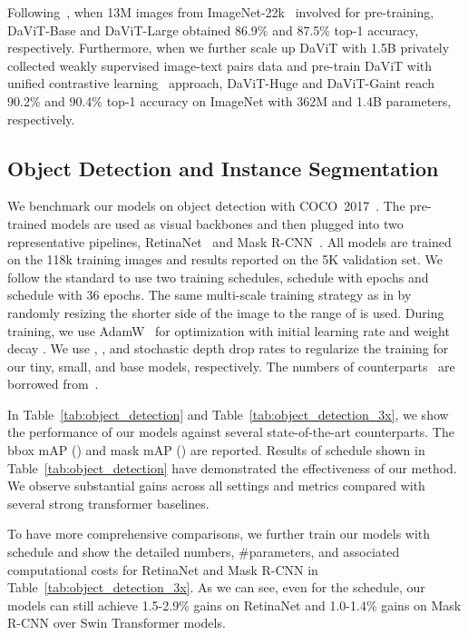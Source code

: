 \documentclass[runningheads]{llncs}
\newcommand{\model}{DaViT\xspace}
\newcommand{\modelInTable}{DaViT\xspace}
\begin{document}
Following~\cite{wu2021cvt,dosovitskiy2020image,liu2021swin}, when 13M images from ImageNet-22k~\cite{deng2009imagenet} involved for pre-training, \modelInTable-Base and \modelInTable-Large obtained 86.9\% and 87.5\% top-1 accuracy, respectively. Furthermore, when we further scale up \model with 1.5B privately collected weakly supervised image-text pairs data and pre-train \model with unified contrastive learning~\cite{yuan2021florence} approach, \modelInTable-Huge and \modelInTable-Gaint reach 90.2\% and 90.4\% top-1 accuracy on ImageNet with 362M and 1.4B parameters, respectively.

\subsection{Object Detection and Instance Segmentation}

We benchmark our models on object detection with COCO~2017~\cite{lin2014microsoft}. The pre-trained models are used as visual backbones and then plugged into two representative pipelines, RetinaNet~\cite{lin2017focal} and Mask R-CNN~\cite{he2017mask}. All models are trained on the 118k training images and results reported on the 5K validation set. We follow the standard to use two training schedules,  schedule with  epochs and  schedule with 36 epochs. The same multi-scale training strategy as in \cite{liu2021swin} by randomly resizing the shorter side of the image to the range of  is used. During training, we use AdamW~\cite{loshchilov2017decoupled} for optimization with initial learning rate  and weight decay . We use , , and  stochastic depth drop rates to regularize the training for our tiny, small, and base models, respectively. The numbers of counterparts~\cite{liu2021swin,zhang2021multi} are borrowed from~\cite{yang2021focal}.

In Table~\ref{tab:object_detection} and Table~\ref{tab:object_detection_3x}, we show the performance of our models against several state-of-the-art counterparts. The bbox mAP () and mask mAP () are reported.
Results of  schedule shown in Table~\ref{tab:object_detection} have demonstrated the effectiveness of our method.
We observe substantial gains across all settings and metrics compared with several strong transformer baselines.


To have more comprehensive comparisons, we further train our models with  schedule and show the detailed numbers, \#parameters, and associated computational costs for RetinaNet and Mask R-CNN in Table~\ref{tab:object_detection_3x}. As we can see, even for the  schedule, our models can still achieve 1.5-2.9\% gains on RetinaNet  and 1.0-1.4\% gains on Mask R-CNN  over Swin Transformer models.
\end{document}
